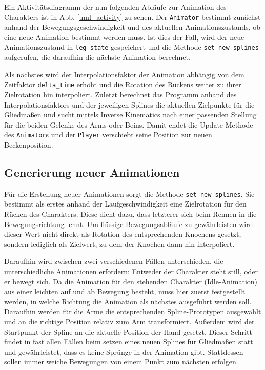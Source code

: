 Ein Aktivitätsdiagramm der nun folgenden Abläufe zur Animation des Charakters ist in Abb. \ref{uml_activity} zu sehen. Der \lstinline{Animator} bestimmt zunächst anhand der Bewegungsgeschwindigkeit und des aktuellen Animationszustands, ob eine neue Animation bestimmt werden muss. Ist dies der Fall, wird der neue Animationszustand in \lstinline{leg_state} gespeichert und die Methode \lstinline{set_new_splines} aufgerufen, die daraufhin die nächste Animation berechnet.

Als nächstes wird der Interpolationsfaktor der Animation abhängig von dem Zeitfaktor \lstinline{delta_time} erhöht und die Rotation des Rückens weiter zu ihrer Zielrotation hin interpoliert. Zuletzt berechnet das Programm anhand des Interpolationsfaktors und der jeweiligen Splines die aktuellen Zielpunkte für die Gliedmaßen und sucht mittels Inverse Kinematics nach einer passenden Stellung für die beiden Gelenke des Arms oder Beins. Damit endet die Update-Methode des \lstinline{Animator}s und der \lstinline{Player} verschiebt seine Position zur neuen Beckenposition.

\subsection{Generierung neuer Animationen}
Für die Erstellung neuer Animationen sorgt die Methode \lstinline{set_new_splines}. Sie bestimmt als erstes anhand der Laufgeschwindigkeit eine Zielrotation für den Rücken des Charakters. Diese dient dazu, dass letzterer sich beim Rennen in die Bewegungsrichtung lehnt. Um flüssige Bewegungsabläufe zu gewährleisten wird dieser Wert nicht direkt als Rotation des entsprechenden Knochens gesetzt, sondern lediglich als Zielwert, zu dem der Knochen dann hin interpoliert.

Daraufhin wird zwischen zwei verschiedenen Fällen unterschieden, die unterschiedliche Animationen erfordern: Entweder der Charakter steht still, oder er bewegt sich. Da die Animation für den stehenden Charakter (Idle-Animation) aus einer leichten auf und ab Bewegung besteht, muss hier zuerst festgestellt werden, in welche Richtung die Animation als nächstes ausgeführt werden soll. Daraufhin werden für die Arme die entsprechenden Spline-Prototypen ausgewählt und an die richtige Position relativ zum Arm transformiert. Außerdem wird der Startpunkt der Spline an die aktuelle Position der Hand gesetzt. Dieser Schritt findet in fast allen Fällen beim setzen eines neuen Splines für Gliedmaßen statt und gewährleistet, dass es keine Sprünge in der Animation gibt. Stattdessen sollen immer weiche Bewegungen von einem Punkt zum nächsten erfolgen.

